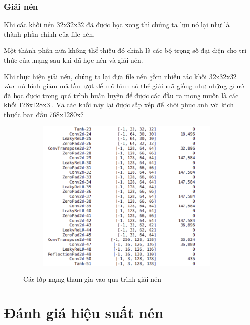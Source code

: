 \subsubsection{Giải nén}

Khi các khối nén 32x32x32 đã được học xong thì chúng ta lưu nó lại như là thành phần chính
của file nén.

Một thành phần nữa không thể thiếu đó chính là các bộ trọng số đại diện cho
tri thức của mạng sau khi đã học nén và giải nén.

Khi thực hiện giải nén, chúng ta lại đưa file nén gồm nhiều các khối 32x32x32 vào mô hình giảm mã
lần lượt để mô hình có thể giải mã giống như những gì nó đã học được trong quá trình huấn luyện
để được các đầu ra mong muốn là các khối 128x128x3
. Và các khối này lại được sắp xếp để khôi phục ảnh với kích thước ban đầu 768x1280x3


\begin{figure}
    \begin{subfigure}{0.8\textwidth}
        \includegraphics[width=1.\linewidth]{Chapters/items/decode.jpg}
        \label{fig: decode}
    \end{subfigure}
    \caption{Các lớp mạng tham gia vào quá trình giải nén}
\end{figure}


\newpage
\section{Đánh giá hiệu suất nén}

